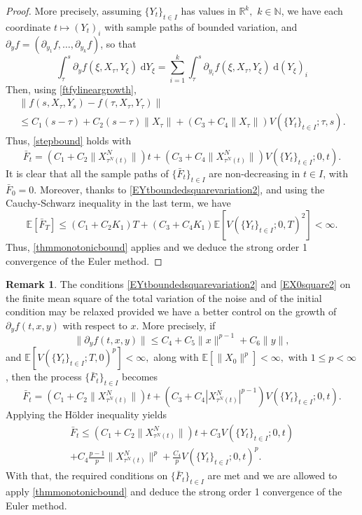 \documentclass[reqno,12pt]{amsart}
\theoremstyle{plain} %
\theoremstyle{definition} %
\newtheorem{remark}{Remark}[section]
\begin{document}
\begin{proof}
    More precisely, assuming $\{Y_t\}_{t\in I}$ has values in $\mathbb{R}^k,$ $k\in \mathbb{N}$, we have each coordinate $t \mapsto (Y_t)_i$ with sample paths of bounded variation, and $\partial_y f = (\partial_{y_1}f, \ldots, \partial_{y_k}f)$, so that
    \[
        \int_\tau^s \partial_y f(\xi, X_\tau, Y_\xi) \;\mathrm{d} Y_\xi = \sum_{i=1}^k \int_\tau^s \partial_{y_i} f(\xi, X_\tau, Y_\xi) \;\mathrm{d} (Y_\xi)_i
    \]
    Then, using \eqref{ftfylineargrowth},
    \begin{multline*}
        \|f(s, X_\tau, Y_s) - f(\tau, X_\tau, Y_\tau)\| \\
        \leq C_1 (s-\tau) + C_2(s-\tau) \|X_\tau\| + (C_3 + C_4 \|X_\tau\|) V(\{Y_t\}_{t\in I}; \tau, s).
    \end{multline*}
    Thus, \eqref{stepbound} holds with
    \[
        \bar F_t = (C_1 + C_2 \|X_{\tau^N(t)}^N\|)t + (C_3 + C_4 \|X_{\tau^N(t)}^N\|) V(\{Y_t\}_{t\in I}; 0, t).
    \]
    It is clear that all the sample paths of $\{\bar F_t\}_{t\in I}$ are non-decreasing in $t\in I$, with $\bar F_0 = 0$. Moreover, thanks to \eqref{EYtboundedsquarevariation2}, and using the Cauchy-Schwarz inequality in the last term, we have
    \[
        \mathbb{E}[\bar F_T] \leq (C_1 + C_2 K_1)T + (C_3 + C_4K_1)\mathbb{E}[V(\{Y_t\}_{t\in I}; 0, T)^2] < \infty.
    \]
    Thus, \cref{thmmonotonicbound} applies and we deduce the strong order 1 convergence of the Euler method.
\end{proof}

\begin{remark}
    The conditions \eqref{EYtboundedsquarevariation2} and \eqref{EX0square2} on the finite mean square of the total variation of the noise and of the initial condition may be relaxed provided we have a better control on the growth of $\partial_y f(t, x, y)$ with respect to $x$. More precisely, if
    \[
        \|\partial_y f(t, x, y)\| \leq C_4 + C_5\|x\|^{p-1} + C_6\|y\|,
    \]
    and $\mathbb{E}[V(\{Y_t\}_{t\in I}; T, 0)^p] < \infty,$ along with $\mathbb{E}[\|X_0\|^p] < \infty,$ with $1 \leq p < \infty$, then the process $\{\bar F_t\}_{t\in I}$ becomes
    \[
        \bar F_t = (C_1 + C_2 \|X_{\tau^N(t)}^N\|)t + (C_3 + C_4 |X_{\tau^N(t)}^N|^{p-1}) V(\{Y_t\}_{t\in I}; 0, t).
    \]
    Applying the H\"older inequality yields
    \begin{multline*}
        \bar F_t \leq (C_1 + C_2 \|X_{\tau^N(t)}^N\|)t + C_3 V(\{Y_t\}_{t\in I}; 0, t) \\
        + C_4 \frac{p-1}{p}\|X_{\tau^N(t)}^N\|^p  + \frac{C_4}{p} V(\{Y_t\}_{t\in I}; 0, t)^p.
    \end{multline*}
    With that, the required conditions on $\{\bar F_t\}_{t\in I}$ are met and we are allowed to apply \cref{thmmonotonicbound} and deduce the strong order 1 convergence of the Euler method.
\end{remark}
\end{document}
